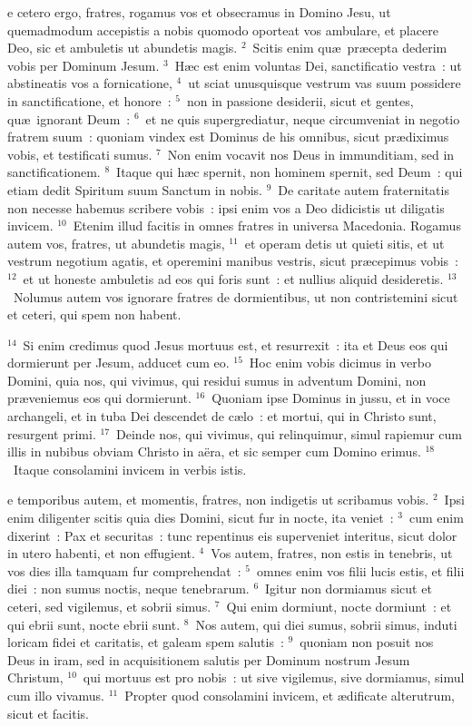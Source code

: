 \bchapter
{}e cetero ergo, fratres, rogamus vos et obsecramus in Domino Jesu, ut quemadmodum accepistis a nobis quomodo oporteat vos ambulare, et placere Deo, sic et ambuletis ut abundetis magis.
${}^{2}$~Scitis enim qu\ae\ pr\ae cepta dederim vobis per Dominum Jesum.
${}^{3}$~H\ae c est enim voluntas Dei, sanctificatio vestra~: ut abstineatis vos a fornicatione,
${}^{4}$~ut sciat unusquisque vestrum vas suum possidere in sanctificatione, et honore~:
${}^{5}$~non in passione desiderii, sicut et gentes, qu\ae\ ignorant Deum~:
${}^{6}$~et ne quis supergrediatur, neque circumveniat in negotio fratrem suum~: quoniam vindex est Dominus de his omnibus, sicut pr\ae diximus vobis, et testificati sumus.
${}^{7}$~Non enim vocavit nos Deus in immunditiam, sed in sanctificationem.
${}^{8}$~Itaque qui h\ae c spernit, non hominem spernit, sed Deum~: qui etiam dedit Spiritum suum Sanctum in nobis.
${}^{9}$~De caritate autem fraternitatis non necesse habemus scribere vobis~: ipsi enim vos a Deo didicistis ut diligatis invicem.
${}^{10}$~Etenim illud facitis in omnes fratres in universa Macedonia. Rogamus autem vos, fratres, ut abundetis magis,
${}^{11}$~et operam detis ut quieti sitis, et ut vestrum negotium agatis, et operemini manibus vestris, sicut pr\ae cepimus vobis~:
${}^{12}$~et ut honeste ambuletis ad eos qui foris sunt~: et nullius aliquid desideretis.
${}^{13}$~Nolumus autem vos ignorare fratres de dormientibus, ut non contristemini sicut et ceteri, qui spem non habent.


${}^{14}$~Si enim credimus quod Jesus mortuus est, et resurrexit~: ita et Deus eos qui dormierunt per Jesum, adducet cum eo.
${}^{15}$~Hoc enim vobis dicimus in verbo Domini, quia nos, qui vivimus, qui residui sumus in adventum Domini, non pr\ae veniemus eos qui dormierunt.
${}^{16}$~Quoniam ipse Dominus in jussu, et in voce archangeli, et in tuba Dei descendet de c\ae lo~: et mortui, qui in Christo sunt, resurgent primi.
${}^{17}$~Deinde nos, qui vivimus, qui relinquimur, simul rapiemur cum illis in nubibus obviam Christo in a\"era, et sic semper cum Domino erimus.
${}^{18}$~Itaque consolamini invicem in verbis istis.

\bchapter
{}e temporibus autem, et momentis, fratres, non indigetis ut scribamus vobis.
${}^{2}$~Ipsi enim diligenter scitis quia dies Domini, sicut fur in nocte, ita veniet~:
${}^{3}$~cum enim dixerint~: Pax et securitas~: tunc repentinus eis superveniet interitus, sicut dolor in utero habenti, et non effugient.
${}^{4}$~Vos autem, fratres, non estis in tenebris, ut vos dies illa tamquam fur comprehendat~:
${}^{5}$~omnes enim vos filii lucis estis, et filii diei~: non sumus noctis, neque tenebrarum.
${}^{6}$~Igitur non dormiamus sicut et ceteri, sed vigilemus, et sobrii simus.
${}^{7}$~Qui enim dormiunt, nocte dormiunt~: et qui ebrii sunt, nocte ebrii sunt.
${}^{8}$~Nos autem, qui diei sumus, sobrii simus, induti loricam fidei et caritatis, et galeam spem salutis~:
${}^{9}$~quoniam non posuit nos Deus in iram, sed in acquisitionem salutis per Dominum nostrum Jesum Christum,
${}^{10}$~qui mortuus est pro nobis~: ut sive vigilemus, sive dormiamus, simul cum illo vivamus.
${}^{11}$~Propter quod consolamini invicem, et \ae dificate alterutrum, sicut et facitis.


